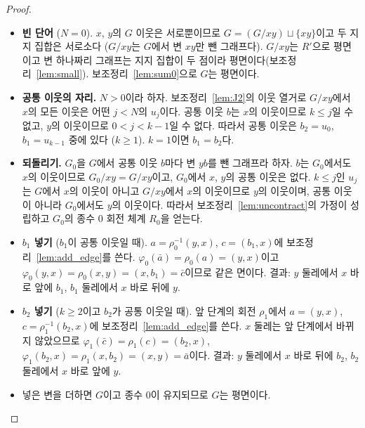 \begin{proof}
\leanok
\begin{itemize}
  \item \textbf{빈 단어} (\(N = 0\)). \(x\), \(y\)의 \(G\) 이웃은 서로뿐이므로 \(G = (G/xy) \sqcup \{xy\}\)이고 두 지지
        집합은 서로소다 (\(G/xy\)는 \(G\)에서 변 \(xy\)만 뺀 그래프다). \(G/xy\)는 \(R'\)으로 평면이고 변 하나짜리
        그래프는 지지 집합이 두 점이라 평면이다(보조정리~\ref{lem:small}). 보조정리~\ref{lem:sum0}으로 \(G\)는 평면이다.
  \item \textbf{공통 이웃의 자리.} \(N > 0\)이라 하자. 보조정리~\ref{lem:J2}의 이웃 열거로 \(G/xy\)에서 \(x\)의 모든 이웃은
        어떤 \(j < N\)의 \(u_j\)이다. 공통 이웃 \(b\)는 \(x\)의 이웃이므로 \(k \le j\)일 수 없고, \(y\)의 이웃이므로
        \(0 < j < k - 1\)일 수 없다. 따라서 공통 이웃은 \(b_2 = u_0\), \(b_1 = u_{k-1}\) 중에 있다 (\(k \ge 1\)).
        \(k = 1\)이면 \(b_1 = b_2\)다.
  \item \textbf{되돌리기.} \(G_0\)을 \(G\)에서 공통 이웃 \(b\)마다 변 \(yb\)를 뺀 그래프라 하자. \(b\)는 \(G_0\)에서도 \(x\)의
        이웃이므로 \(G_0/xy = G/xy\)이고, \(G_0\)에서 \(x\), \(y\)의 공통 이웃은 없다. \(k \le j\)인 \(u_j\)는 \(G\)에서 \(x\)의
        이웃이 아니고 \(G/xy\)에서 \(x\)의 이웃이므로 \(y\)의 이웃이며, 공통 이웃이 아니라 \(G_0\)에서도 \(y\)의 이웃이다.
        따라서 보조정리~\ref{lem:uncontract}의 가정이 성립하고 \(G_0\)의 종수 0 회전 체계 \(R_0\)을 얻는다.
  \item \textbf{\(b_1\) 넣기} (\(b_1\)이 공통 이웃일 때). \(a = \rho_0^{-1}(y, x)\), \(c = (b_1, x)\)에 보조정리~\ref{lem:add_edge}를
        쓴다. \(\varphi_0(\bar a) = \rho_0(a) = (y, x)\)이고 \(\varphi_0(y, x) = \rho_0(x, y) = (x, b_1) = \bar c\)이므로 같은
        면이다. 결과: \(y\) 둘레에서 \(x\) 바로 앞에 \(b_1\), \(b_1\) 둘레에서 \(x\) 바로 뒤에 \(y\).
  \item \textbf{\(b_2\) 넣기} (\(k \ge 2\)이고 \(b_2\)가 공통 이웃일 때). 앞 단계의 회전 \(\rho_1\)에서 \(a = (y, x)\),
        \(c = \rho_1^{-1}(b_2, x)\)에 보조정리~\ref{lem:add_edge}를 쓴다. \(x\) 둘레는 앞 단계에서 바뀌지 않았으므로
        \(\varphi_1(\bar c) = \rho_1(c) = (b_2, x)\), \(\varphi_1(b_2, x) = \rho_1(x, b_2) = (x, y) = \bar a\)이다. 결과: \(y\) 둘레에서
        \(x\) 바로 뒤에 \(b_2\), \(b_2\) 둘레에서 \(x\) 바로 앞에 \(y\).
  \item 넣은 변을 더하면 \(G\)이고 종수 0이 유지되므로 \(G\)는 평면이다.
\end{itemize}

\end{proof}
